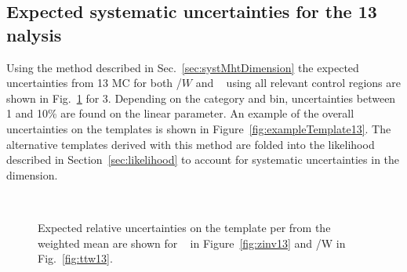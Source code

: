 \subsection{Expected systematic uncertainties for the 13 \texorpdfstring{\TeV} analysis}
\label{sec:syst13TeV}
Using the method described in Sec.~\ref{sec:systMhtDimension} the expected uncertainties
from 13 \TeV MC for both \ttbar/$W$  and \zInv~ using all relevant control regions are
shown in Fig.~\ref{fig:expected13} for 3\ifb. 
Depending on the category and \scalht bin, uncertainties between 1 and 10\% are found
on the linear parameter.
An example of the overall uncertainties on the \mht templates is shown
in Figure~\ref{fig:exampleTemplate13}.
The alternative templates derived with this method are folded into the 
likelihood described in Section~\ref{sec:likelihood} to account for
systematic uncertainties in the \mht dimension.


\begin{figure}[h!]
  \centering
  ~~
  \\
  \caption{\label{fig:expected13} Expected relative uncertainties on the template per \GeV from the weighted mean are shown for \zInv~ in Figure~\ref{fig:zinv13} 
  and \ttbar/W in Fig.~\ref{fig:ttw13}.}
  
\end{figure}

